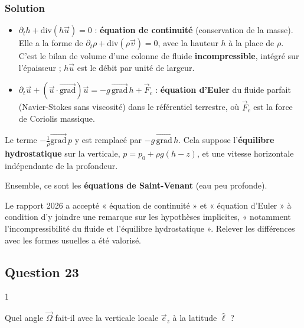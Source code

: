 \documentclass[11pt,a4paper]{article}
\providecommand{\tightlist}{\setlength{\itemsep}{0pt}\setlength{\parskip}{0pt}}
\begin{document}
\hypertarget{solution-30}{%
\subsubsection{Solution}\label{solution-30}}

\begin{itemize}
\tightlist
\item
  \(\partial_th+\mathrm{div}(h\vec u)=0\) : \textbf{équation de continuité} (conservation de la masse). Elle a la forme de \(\partial_t\rho+\mathrm{div}(\rho\vec v)=0\), avec la hauteur \(h\) à la place de \(\rho\). C'est le bilan de volume d'une colonne de fluide \textbf{incompressible}, intégré sur l'épaisseur ; \(h\vec u\) est le débit par unité de largeur.
\item
  \(\partial_t\vec u+(\vec u\cdot\overrightarrow{\mathrm{grad}})\vec u=-g\,\overrightarrow{\mathrm{grad}}\,h+\vec F_c\) : \textbf{équation d'Euler} du fluide parfait (Navier-Stokes sans viscosité) dans le référentiel terrestre, où \(\vec F_c\) est la force de Coriolis massique.
\end{itemize}

Le terme \(-\frac1\rho\overrightarrow{\mathrm{grad}}\,p\) y est remplacé par \(-g\,\overrightarrow{\mathrm{grad}}\,h\). Cela suppose l'\textbf{équilibre hydrostatique} sur la verticale, \(p=p_0+\rho g(h-z)\), et une vitesse horizontale indépendante de la profondeur.

Ensemble, ce sont les \textbf{équations de Saint-Venant} (eau peu profonde).

\begin{jury}

Le rapport 2026 a accepté « équation de continuité » et « équation d'Euler » à condition d'y joindre une remarque sur les hypothèses implicites, « notamment l'incompressibilité du fluide et l'équilibre hydrostatique ». Relever les différences avec les formes usuelles a été valorisé.

\end{jury}

\hypertarget{question-23}{%
\subsection{Question 23}\label{question-23}}

\begin{indication}{1}

Quel angle \(\vec\Omega\) fait-il avec la verticale locale \(\vec e_z\) à la latitude \(\hat\ell\) ?

\end{indication}
\end{document}
